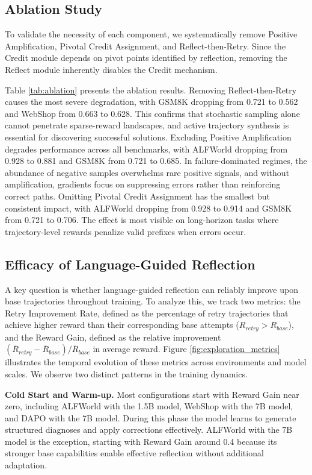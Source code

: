 \documentclass[11pt]{article}
\theoremstyle{definition}
\theoremstyle{remark}
\begin{document}
\subsection{Ablation Study} 
\vspace{-0.3em}
To validate the necessity of each component, we systematically remove Positive Amplification, Pivotal Credit Assignment, and Reflect-then-Retry. Since the Credit module depends on pivot points identified by reflection, removing the Reflect module inherently disables the Credit mechanism.

Table \ref{tab:ablation} presents the ablation results. Removing Reflect-then-Retry causes the most severe degradation, with GSM8K dropping from 0.721 to 0.562 and WebShop from 0.663 to 0.628. This confirms that stochastic sampling alone cannot penetrate sparse-reward landscapes, and active trajectory synthesis is essential for discovering successful solutions. Excluding Positive Amplification degrades performance across all benchmarks, with ALFWorld dropping from 0.928 to 0.881 and GSM8K from 0.721 to 0.685. In failure-dominated regimes, the abundance of negative samples overwhelms rare positive signals, and without amplification, gradients focus on suppressing errors rather than reinforcing correct paths. Omitting Pivotal Credit Assignment has the smallest but consistent impact, with ALFWorld dropping from 0.928 to 0.914 and GSM8K from 0.721 to 0.706. The effect is most visible on long-horizon tasks where trajectory-level rewards penalize valid prefixes when errors occur.

\subsection{Efficacy of Language-Guided Reflection}
\label{sec:reflect_efficacy}


A key question is whether language-guided reflection can reliably improve upon base trajectories throughout training. To analyze this, we track two metrics: the Retry Improvement Rate, defined as the percentage of retry trajectories that achieve higher reward than their corresponding base attempts ($R_{retry} > R_{base}$), and the Reward Gain, defined as the relative improvement $(\bar{R}_{retry} - \bar{R}_{base}) / \bar{R}_{base}$ in average reward. Figure \ref{fig:exploration_metrics} illustrates the temporal evolution of these metrics across environments and model scales. We observe two distinct patterns in the training dynamics.

\textbf{Cold Start and Warm-up.} Most configurations start with Reward Gain near zero, including ALFWorld with the 1.5B model, WebShop with the 7B model, and DAPO with the 7B model. During this phase the model learns to generate structured diagnoses and apply corrections effectively. ALFWorld with the 7B model is the exception, starting with Reward Gain around 0.4 because its stronger base capabilities enable effective reflection without additional adaptation.
\end{document}
